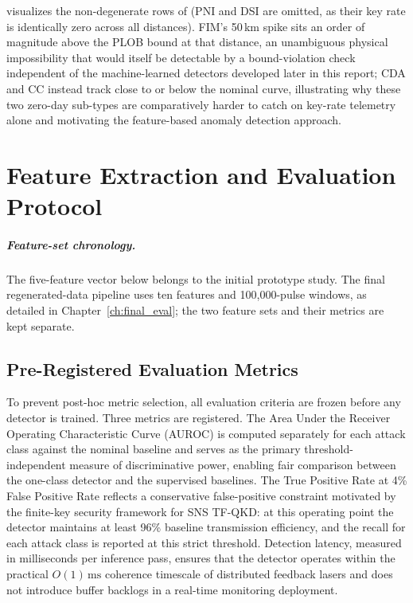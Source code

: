 \documentclass[12pt, a4paper]{report}
\begin{document}
 visualizes the non-degenerate rows of  (PNI and DSI are omitted, as their key rate is identically zero across all distances). FIM's 50\,km spike sits an order of magnitude above the PLOB bound at that distance, an unambiguous physical impossibility that would itself be detectable by a bound-violation check independent of the machine-learned detectors developed later in this report; CDA and CC instead track close to or below the nominal curve, illustrating why these two zero-day sub-types are comparatively harder to catch on key-rate telemetry alone and motivating the feature-based anomaly detection approach.

\chapter{Feature Extraction and Evaluation Protocol}\label{ch:features}
\paragraph{Feature-set chronology.} The five-feature vector below belongs to the initial prototype study. The final regenerated-data pipeline uses ten features and 100,000-pulse windows, as detailed in Chapter~\ref{ch:final_eval}; the two feature sets and their metrics are kept separate.


\section{Pre-Registered Evaluation Metrics}\label{sec:metrics}
To prevent post-hoc metric selection, all evaluation criteria are frozen before any detector is trained. Three metrics are registered. The Area Under the Receiver Operating Characteristic Curve (AUROC) is computed separately for each attack class against the nominal baseline and serves as the primary threshold-independent measure of discriminative power, enabling fair comparison between the one-class detector and the supervised baselines. The True Positive Rate at 4\% False Positive Rate reflects a conservative false-positive constraint motivated by the finite-key security framework for SNS TF-QKD: at this operating point the detector maintains at least 96\% baseline transmission efficiency, and the recall for each attack class is reported at this strict threshold. Detection latency, measured in milliseconds per inference pass, ensures that the detector operates within the practical $O(1)\,\text{ms}$ coherence timescale of distributed feedback lasers and does not introduce buffer backlogs in a real-time monitoring deployment.
\end{document}
